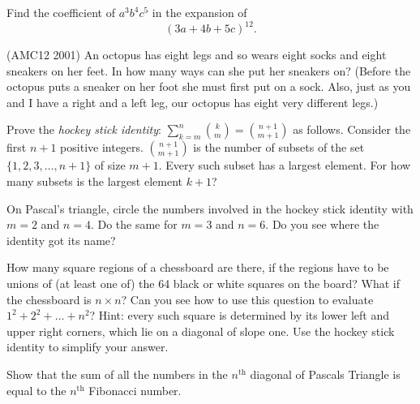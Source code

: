 \documentclass[12pt]{amsart}
\theoremstyle{definition}
\begin{document}
\problem  Find the coefficient of $a^3b^4c^5$ in the expansion of $$(3a+4b+5c)^{12}.$$%


\problem (AMC12 2001) An octopus has eight legs and so wears eight socks and eight sneakers on her feet. In how many ways can she put her sneakers on? (Before the octopus puts a sneaker on her foot she must first put on a sock.  Also, just as you and I have a right and a left leg, our octopus has eight very different legs.)

\problem Prove the \emph{hockey stick identity}: $\displaystyle \sum_{k=m}^n {k\choose m}={{n+1}\choose {m+1}}$ as follows. Consider the first $n+1$ positive integers. ${{n+1}\choose {m+1}}$ is the number of subsets of the set $\{1,2,3,\dots , n+1\}$ of size $m+1$. Every such subset has a largest element. For how many subsets is the largest element $k+1$?
\vspace{.05in}

On Pascal's triangle, circle the numbers involved in the hockey stick identity with $m=2$ and $n=4$. Do the same for $m=3$ and $n=6$. Do you see where the identity got its name?


\problem How many square regions of a chessboard are there, if the regions have to be unions of (at least one of) the 64 black or white  squares on the board?  What if the chessboard is $n\times n$? Can you see how to use this question to evaluate $1^2+2^2+\dots +n^2$?  Hint: every such square is determined by its lower left and upper right corners, which lie on a diagonal of slope one. Use the hockey stick identity to simplify your answer.%

\problem Show that the sum of all the numbers in the $n^\text{th}$ diagonal of Pascals Triangle is equal to the $n^\text{th}$ Fibonacci number.
\begin{figure}[!h]
\end{figure}%
\end{document}
